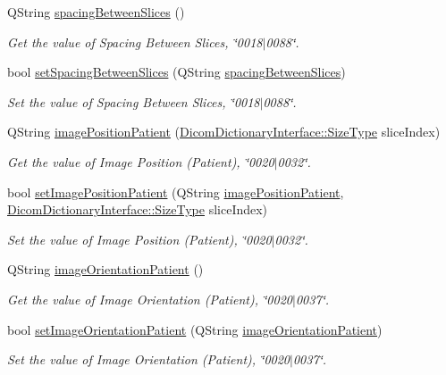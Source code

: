 \begin{DoxyCompactItemize}
Q\+String \hyperlink{class_dicom_dictionary_interface_a08f8065f6b41b30e660fd1ff23e4fe0f}{spacing\+Between\+Slices} ()
\begin{DoxyCompactList}\small\item\em Get the value of Spacing Between Slices, \char`\"{}0018$\vert$0088\char`\"{}. \end{DoxyCompactList}\item 
bool \hyperlink{class_dicom_dictionary_interface_aba913a5b641397061a8166a2a242bf29}{set\+Spacing\+Between\+Slices} (Q\+String \hyperlink{class_dicom_dictionary_interface_a08f8065f6b41b30e660fd1ff23e4fe0f}{spacing\+Between\+Slices})
\begin{DoxyCompactList}\small\item\em Set the value of Spacing Between Slices, \char`\"{}0018$\vert$0088\char`\"{}. \end{DoxyCompactList}\item 
Q\+String \hyperlink{class_dicom_dictionary_interface_a0f0cd4f426726af6a6e0ba9d4a4412d0}{image\+Position\+Patient} (\hyperlink{class_dicom_dictionary_interface_a4fde43e0647ab57f29eb2c59c3d051ca}{Dicom\+Dictionary\+Interface\+::\+Size\+Type} slice\+Index)
\begin{DoxyCompactList}\small\item\em Get the value of Image Position (Patient), \char`\"{}0020$\vert$0032\char`\"{}. \end{DoxyCompactList}\item 
bool \hyperlink{class_dicom_dictionary_interface_a451997eeb35ef9011b23d8800fe9ce3e}{set\+Image\+Position\+Patient} (Q\+String \hyperlink{class_dicom_dictionary_interface_a0f0cd4f426726af6a6e0ba9d4a4412d0}{image\+Position\+Patient}, \hyperlink{class_dicom_dictionary_interface_a4fde43e0647ab57f29eb2c59c3d051ca}{Dicom\+Dictionary\+Interface\+::\+Size\+Type} slice\+Index)
\begin{DoxyCompactList}\small\item\em Set the value of Image Position (Patient), \char`\"{}0020$\vert$0032\char`\"{}. \end{DoxyCompactList}\item 
Q\+String \hyperlink{class_dicom_dictionary_interface_a6dc83ae90c17a9fcf28c9d18f1f0aec8}{image\+Orientation\+Patient} ()
\begin{DoxyCompactList}\small\item\em Get the value of Image Orientation (Patient), \char`\"{}0020$\vert$0037\char`\"{}. \end{DoxyCompactList}\item 
bool \hyperlink{class_dicom_dictionary_interface_aefac106ef1ed129d6678df977eef2bbf}{set\+Image\+Orientation\+Patient} (Q\+String \hyperlink{class_dicom_dictionary_interface_a6dc83ae90c17a9fcf28c9d18f1f0aec8}{image\+Orientation\+Patient})
\begin{DoxyCompactList}\small\item\em Set the value of Image Orientation (Patient), \char`\"{}0020$\vert$0037\char`\"{}. \end{DoxyCompactList}\end{DoxyCompactItemize}



